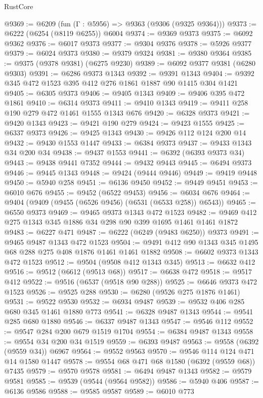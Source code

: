 \begin{lexlean}{RustCore}
\begin{coremodule}
@9369 := @6209 (fun (Γ : @5956) => @9363 (@9306 (@9325 @9364)))
@9373 := @6222 (@6254 (@8119 @6255)) @6004
@9374 := @9369 @9373
@9375 := @6092 @9362
@9376 := @6017 @9373
@9377 := @9304 @9376
@9378 := @5926 @9377
@9379 := @6024 @9373
@9380 := @9379 @9324
@9381 := @9380 @9364
@9385 := @9375 (@9378 @9381) (@6275 @9230)
@9389 := @6092 @9377 @9381 (@6280 @9303)
@9391 := @6286 @9373 @1343
@9392 := @9391 @1343
@9404 := @9392 @345 @472 @1523 @395 @412 @276 @1861 @1887 @90 @1415 @304 @1421
@9405 := @6305 @9373
@9406 := @9405 @1343
@9409 := @9406 @395 @472 @1861
@9410 := @6314 @9373
@9411 := @9410 @1343
@9419 := @9411 @258 @190 @279 @472 @1461 @1555 @1343 @676
@9420 := @6328 @9373
@9421 := @9420 @1343
@9423 := @9421 @190 @279
@9424 := @9423 @1555
@9425 := @6337 @9373
@9426 := @9425 @1343
@9430 := @9426 @112 @124 @200 @14
@9432 := @9430 @1553 @1447
@9433 := @6384 @9373
@9437 := @9433 @1343 @34 @200 @34
@9438 := @9437 @1553
@9441 := @6392 (@6393 @9373 @34)
@9443 := @9438 @9441 @7352
@9444 := @9432 @9443
@9445 := @6494 @9373
@9446 := @9445 @1343
@9448 := @9424 (@9444 @9446)
@9449 := @9419 @9448
@9450 := @5940 @258
@9451 := @6136 @9450
@9452 := @9449 @9451
@9453 := @6010 @676
@9455 := @9452 (@6522 @9453)
@9456 := @6034 @676
@9464 := @9404 (@9409 (@9455 (@6526 @9456) (@6531 (@6533 @258)) @6543))
@9465 := @6550 @9373
@9469 := @9465 @9373 @1343 @472 @1523
@9482 := @9469 @412 @275 @1343 @345 @1886 @34 @298 @90 @399 @1695 @1461 @1461 @1872
@9483 := @6227 @471
@9487 := @6222 (@6249 (@9483 @6250)) @9373
@9491 := @9465 @9487 @1343 @472 @1523
@9504 := @9491 @412 @90 @1343 @345 @1495 @68 @288 @275 @408 @1876 @1461 @1461 @1882
@9508 := @6602 @9373 @1343 @472 @1523
@9512 := @9504 (@9508 @412 @1343 @345)
@9513 := @6632 @412
@9516 := @9512 (@6612 (@9513 @68))
@9517 := @6638 @472
@9518 := @9517 @412
@9522 := @9516 (@6537 (@9518 @90 @288))
@9525 := @6646 @9373 @472 @1523
@9526 := @9525 @288
@9530 := @6280 (@9526 @275 @1876 @1461)
@9531 := @9522 @9530
@9532 := @6934 @9487
@9539 := @9532 @406 @285 @680 @345 @1461 @1880 @773
@9541 := @6328 @9487 @1343
@9544 := @9541 @285 @680 @1880
@9546 := @6337 @9487 @1343
@9547 := @9546 @112
@9552 := @9547 @284 @200 @679 @1519 @1704
@9554 := @6384 @9487 @1343
@9558 := @9554 @34 @200 @34 @1519
@9559 := @6393 @9487
@9563 := @9558 (@6392 (@9559 @34)) @6967
@9564 := @9552 @9563
@9570 := @9546 @114 @124 @471 @14 @1580 @1447
@9578 := @9554 @68 @471 @68 @1580 (@6392 (@9559 @68)) @7435
@9579 := @9570 @9578
@9581 := @6494 @9487 @1343
@9582 := @9579 @9581
@9585 := @9539 (@9544 (@9564 @9582))
@9586 := @5940 @406
@9587 := @6136 @9586
@9588 := @9585 @9587
@9589 := @6010 @773

\end{coremodule}
\end{lexlean}
